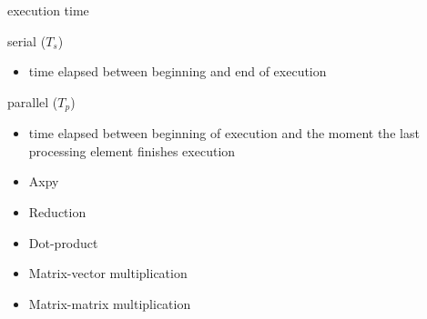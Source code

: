 \documentclass[10pt, t]{beamer}
\begin{document}
  \begin{frame}{execution time}
    \begin{block}{serial ($T_s$)}
      \begin{itemize}
        \item time elapsed between beginning and end of execution
      \end{itemize}
    \end{block}

    \begin{block}{parallel ($T_p$)}
      \begin{itemize}
        \item time elapsed between beginning of execution and the moment the
          last processing element finishes execution
      \end{itemize}
    \end{block}

    \begin{itemize}
      \item Axpy
      \item Reduction
      \item Dot-product
      \item Matrix-vector multiplication
      \item Matrix-matrix multiplication
    \end{itemize}

  \end{frame}
\end{document}
